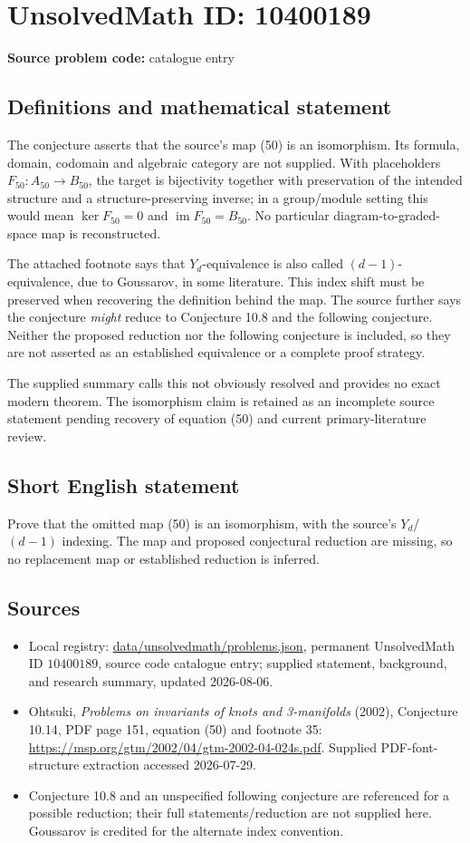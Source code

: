 \documentclass[11pt]{article}
\begin{document}
\section*{UnsolvedMath ID: 10400189}
\textbf{Source problem code:} catalogue entry
\subsection{Definitions and mathematical statement}
The conjecture asserts that the source's map (50) is an isomorphism. Its formula, domain, codomain and algebraic category are not supplied. With placeholders \(F_{50}:A_{50}\to B_{50}\), the target is bijectivity together with preservation of the intended structure and a structure-preserving inverse; in a group/module setting this would mean \(\ker F_{50}=0\) and \(\operatorname{im}F_{50}=B_{50}\). No particular diagram-to-graded-space map is reconstructed.

The attached footnote says that \(Y_d\)-equivalence is also called \((d-1)\)-equivalence, due to Goussarov, in some literature. This index shift must be preserved when recovering the definition behind the map. The source further says the conjecture \emph{might} reduce to Conjecture 10.8 and the following conjecture. Neither the proposed reduction nor the following conjecture is included, so they are not asserted as an established equivalence or a complete proof strategy.

The supplied summary calls this not obviously resolved and provides no exact modern theorem. The isomorphism claim is retained as an incomplete source statement pending recovery of equation (50) and current primary-literature review.
\subsection{Short English statement}
Prove that the omitted map (50) is an isomorphism, with the source's \(Y_d\)/\((d-1)\) indexing. The map and proposed conjectural reduction are missing, so no replacement map or established reduction is inferred.
\subsection{Sources}
\begin{itemize}
\item Local registry: \url{data/unsolvedmath/problems.json}, permanent UnsolvedMath ID \(10400189\), source code catalogue entry; supplied statement, background, and research summary, updated 2026-08-06.
\item Ohtsuki, \emph{Problems on invariants of knots and 3-manifolds} (2002), Conjecture 10.14, PDF page 151, equation (50) and footnote 35: \url{https://msp.org/gtm/2002/04/gtm-2002-04-024s.pdf}. Supplied PDF-font-structure extraction accessed 2026-07-29.
\item Conjecture 10.8 and an unspecified following conjecture are referenced for a possible reduction; their full statements/reduction are not supplied here. Goussarov is credited for the alternate index convention.
\end{itemize}
\end{document}
